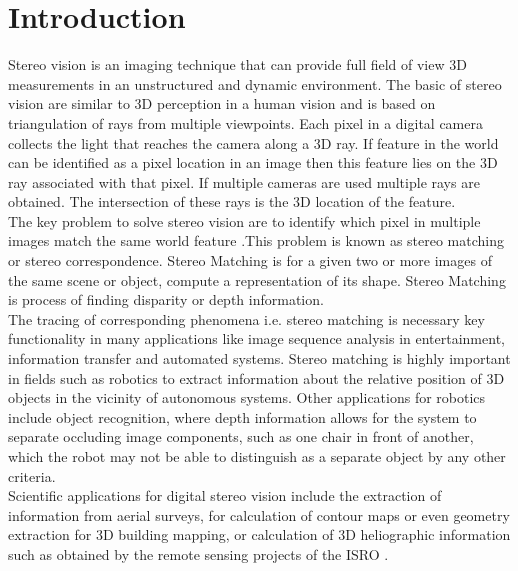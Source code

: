 \chapter{Introduction}
\label{ChapterIntroduction}
%
Stereo vision is an imaging technique that can provide full field of view 3D measurements in an unstructured and dynamic environment. The basic of stereo vision are similar to 3D perception in a human vision and is based on triangulation of rays from multiple viewpoints. Each pixel in a digital camera collects the light that reaches the camera along a 3D ray. If feature in the world can be identified as a pixel location in an image then this feature lies on the 3D ray associated with that pixel. If multiple cameras are used multiple rays are obtained. The intersection of these rays is the 3D location of the feature.\\
The key problem to solve stereo vision are to identify which pixel in multiple images match the same world feature .This problem is known as stereo matching or stereo correspondence. Stereo Matching is for a given two or more images of the same scene or object, compute a representation of its shape. Stereo Matching is process of finding disparity or depth information.\\
The tracing of corresponding phenomena i.e. stereo matching is necessary key functionality in many applications like image sequence analysis in entertainment, information transfer and automated systems. Stereo matching is highly important in fields such as robotics to extract information about the relative position of 3D objects in the vicinity of autonomous systems. Other applications for robotics include object recognition, where depth information allows for the system to separate occluding image components, such as one chair in front of another, which the robot may not be able to distinguish as a separate object by any other criteria.\\
Scientific applications for digital stereo vision include the extraction of information from aerial surveys, for calculation of contour maps or even geometry extraction for 3D building mapping, or calculation of 3D heliographic information such as obtained by the remote sensing projects of the ISRO .

